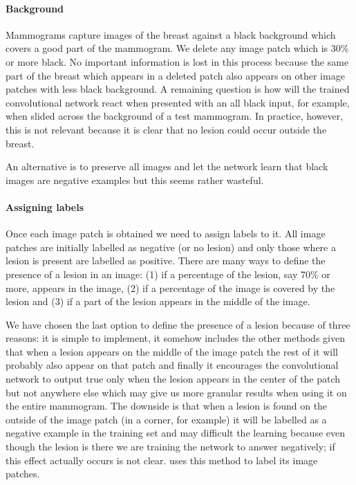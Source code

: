 \paragraph{Background}
Mammograms capture images of the breast against a black background which covers a good part of the mammogram. We delete any image patch which is 30\% or more black. No important information is lost in this process because the same part of the breast which appears in a deleted patch also appears on other image patches with less black background. A remaining question is how will the trained convolutional network react when presented with an all black input, for example, when slided across the background of a test mammogram. In practice, however, this is not relevant because it is clear that no lesion could occur outside the breast. 

An alternative is to preserve all images and let the network learn that black images are negative examples but this seems rather wasteful.

\paragraph{Assigning labels}
Once each image patch is obtained we need to assign labels to it. All image patches are initially labelled as negative (or no lesion) and only those where a lesion is present are labelled as positive. There are many ways to define the presence of a lesion in an image: (1) if a percentage of the lesion, say 70\% or more, appears in the image, (2) if a percentage of the image is covered by the lesion and (3) if a part of the lesion appears in the middle of the image.

We have chosen the last option to define the presence of a lesion because of three reasons: it is simple to implement, it somehow includes the other methods given that when a lesion appears on the middle of the image patch the rest of it will probably also appear on that patch and finally it encourages the convolutional network to output true only when the lesion appears in the center of the patch but not anywhere else which may give us more granular results when using it on the entire mammogram. The downside is that when a lesion is found on the outside of the image patch (in a corner, for example) it will be labelled as a negative example in the training set and may difficult the learning because even though the lesion is there we are training the network to answer negatively; if this effect actually occurs is not clear. \cite{Ciresan2013} uses this method to label its image patches.

